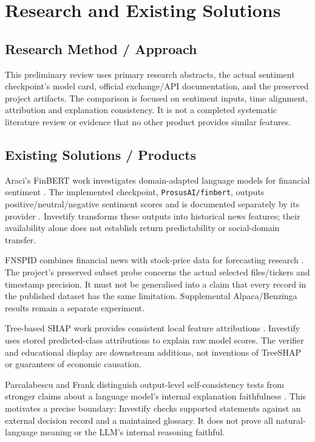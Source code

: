 \chapter{Research and Existing Solutions}
\section{Research Method / Approach}
This preliminary review uses primary research abstracts, the actual sentiment checkpoint's model card, official exchange/API documentation, and the preserved project artifacts. The comparison is focused on sentiment inputs, time alignment, attribution and explanation consistency. It is not a completed systematic literature review or evidence that no other product provides similar features.
\section{Existing Solutions / Products}
Araci's FinBERT work investigates domain-adapted language models for financial sentiment \cite{finbert_paper}. The implemented checkpoint, \texttt{ProsusAI/finbert}, outputs positive/neutral/negative sentiment scores and is documented separately by its provider \cite{finbert_card}. Investify transforms these outputs into historical news features; their availability alone does not establish return predictability or social-domain transfer.

FNSPID combines financial news with stock-price data for forecasting research \cite{fnspid_paper}. The project's preserved subset probe concerns the actual selected files/tickers and timestamp precision. It must not be generalised into a claim that every record in the published dataset has the same limitation. Supplemental Alpaca/Benzinga results remain a separate experiment.

Tree-based SHAP work provides consistent local feature attributions \cite{treeshap_paper}. Investify uses stored predicted-class attributions to explain raw model scores. The verifier and educational display are downstream additions, not inventions of TreeSHAP or guarantees of economic causation.

Parcalabescu and Frank distinguish output-level self-consistency tests from stronger claims about a language model's internal explanation faithfulness \cite{faithfulness_paper}. This motivates a precise boundary: Investify checks supported statements against an external decision record and a maintained glossary. It does not prove all natural-language meaning or the LLM's internal reasoning faithful.
